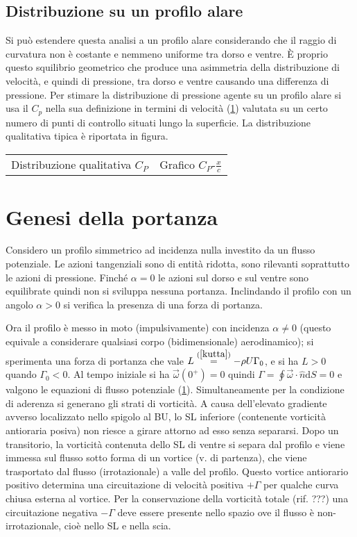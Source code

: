 \documentclass[11pt,a4paper]{report}
\newcommand{\de}{\mathrm d}
\newcommand{\sz}[1]{\scriptsize #1\normalsize}
\begin{document}
        \subsection{Distribuzione su un profilo alare}
        Si può estendere questa analisi a un profilo alare considerando che il raggio di curvatura non è costante e nemmeno uniforme tra dorso e ventre. È proprio questo squilibrio geometrico che produce una asimmetria della distribuzione di velocità, e quindi di pressione, tra dorso e ventre causando una differenza di pressione. Per stimare la distribuzione di pressione agente su un profilo alare si usa il $C_p$ nella sua definizione in termini di velocità (\ref{}) valutata su un certo numero di punti di controllo situati lungo la superficie. La distribuzione qualitativa tipica è riportata in figura.

\begin{center}
\begin{tabular}{cc}
Distribuzione qualitativa $C_P$ &
Grafico $C_P$-$\frac xc$
\end{tabular}
\end{center}

    \section{Genesi della portanza}
	Considero un profilo simmetrico ad incidenza nulla investito da un flusso potenziale. Le azioni tangenziali sono di entità ridotta, sono rilevanti soprattutto le azioni di pressione. Finché $\alpha=0$ le azioni sul dorso e sul ventre sono equilibrate quindi non si sviluppa nessuna portanza. Inclindando il profilo con un angolo $\alpha>0$ si verifica la presenza di una forza di portanza.
	
	Ora il profilo è messo in moto (impulsivamente) con incidenza $\alpha\neq 0$ (questo equivale a considerare qualsiasi corpo \sz{(bidimensionale)} aerodinamico); si sperimenta una forza di portanza che vale $L\overset{(\ref{kutta})}{=}-\rho U\Gamma_0$, e si ha $L>0$ quando $\Gamma_0<0$. Al tempo iniziale si ha $\vec\omega(0^+)=0$ quindi $\Gamma=\oint\vec\omega\cdot\hat n\de S=0$ e valgono le equazioni di flusso potenziale (\ref{}). Simultaneamente per la condizione di aderenza si generano gli strati di vorticità. A causa dell'elevato gradiente avverso localizzato nello spigolo al BU, lo SL inferiore (contenente vorticità antioraria posiva) non riesce a girare attorno ad esso senza separarsi. Dopo un transitorio, la vorticità contenuta dello SL di ventre si separa dal profilo e viene immessa sul flusso sotto forma di un vortice (v. di partenza), che viene trasportato dal flusso (irrotazionale) a valle del profilo. Questo vortice antiorario positivo determina una circuitazione di velocità positiva $+\Gamma$ per qualche curva chiusa esterna al vortice. Per la conservazione della vorticità totale (rif. ???) una circuitazione negativa $-\Gamma$ deve essere presente nello spazio ove il flusso è non-irrotazionale, cioè nello SL e nella scia.
	
\end{document}
